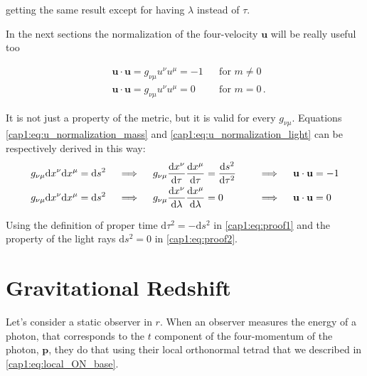 getting the same result except for having $\lambda$ instead of $\tau$.

In the next sections the normalization of the four-velocity $\mathbf u$ will be
really useful too

\begin{subequations}
    \begin{align}
        &\mathbf{u \cdot u} = g_{\nu \mu} u^\nu u^\mu = -1 
        &&\text{for } m \neq 0 \label{cap1:eq:u_normalization_mass} \\
        &\mathbf{u \cdot u} = g_{\nu \mu} u^\nu u^\mu = 0 
        &&\text{for } m = 0 \label{cap1:eq:u_normalization_light} \, .
    \end{align}
    \label{cap1:eq:u_normalization}
\end{subequations}

It is not just a property of the metric, but it is valid for every
$g_{\nu \mu}$.
Equations \ref{cap1:eq:u_normalization_mass} and
\ref{cap1:eq:u_normalization_light} can be respectively derived in this way:
\begin{subequations}
\begin{align}
    g_{\nu \mu} \mathrm{d}x^\nu \mathrm{d}x^\mu = \mathrm{d}s^2
    \quad &\implies \quad
    g_{\nu \mu} \dv{x^\nu}{\tau} \dv{x^\mu}{\tau} = \dv{s^2}{\tau^2}
    \quad &&\implies \quad
    \mathbf{u \cdot u} = -1 \label{cap1:eq:proof1} \\
    g_{\nu \mu} \mathrm{d}x^\nu \mathrm{d}x^\mu = \mathrm{d}s^2
    \quad &\implies \quad
    g_{\nu \mu} \dv{x^\nu}{\lambda} \dv{x^\mu}{\lambda} = 0
    \quad &&\implies \quad
    \mathbf{u \cdot u} = 0 \label{cap1:eq:proof2}
\end{align}
\end{subequations}

Using the definition of proper time $\mathrm{d}\tau^2 = - \mathrm{d}s^2$ in
\ref{cap1:eq:proof1} and the property of the light rays $\mathrm{d}s^2 = 0$ in
\ref{cap1:eq:proof2}.


\section{Gravitational Redshift}

Let's consider a static observer in $r$.
When an observer measures the energy of a photon, that corresponds to the $t$
component of the four-momentum of the photon, $\mathbf{p}$,
they do that using their local orthonormal tetrad
that we described in \ref{cap1:eq:local_ON_base}.

